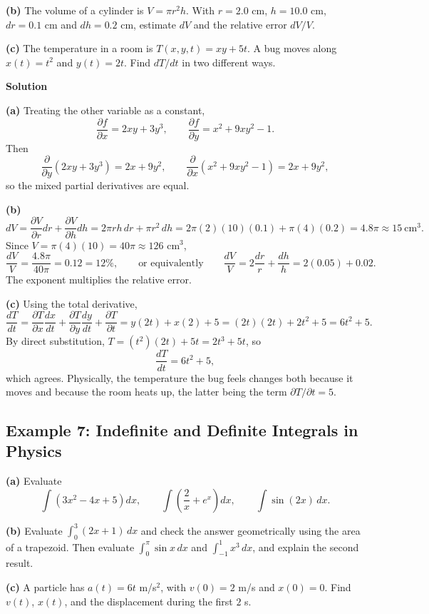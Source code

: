 \documentclass[12pt]{article}
\begin{document}
\textbf{(b)} The volume of a cylinder is $V = \pi r^2h$. With $r = 2.0$ cm, $h = 10.0$ cm, $dr = 0.1$ cm and $dh = 0.2$ cm, estimate $dV$ and the relative error $dV/V$.

\textbf{(c)} The temperature in a room is $T(x,y,t) = xy+5t$. A bug moves along $x(t) = t^2$ and $y(t) = 2t$. Find $dT/dt$ in two different ways.

\bigskip
\textbf{Solution}

\textbf{(a)} Treating the other variable as a constant,
\[
\frac{\partial f}{\partial x} = 2xy+3y^3,
\qquad
\frac{\partial f}{\partial y} = x^2+9xy^2-1 .
\]
Then
\[
\frac{\partial}{\partial y}\left(2xy+3y^3\right) = 2x+9y^2,
\qquad
\frac{\partial}{\partial x}\left(x^2+9xy^2-1\right) = 2x+9y^2,
\]
so the mixed partial derivatives are equal.

\textbf{(b)}
\[
dV = \frac{\partial V}{\partial r}dr + \frac{\partial V}{\partial h}dh
= 2\pi r h\,dr + \pi r^2\,dh
= 2\pi(2)(10)(0.1) + \pi(4)(0.2) = 4.8\pi \approx 15\ \text{cm}^3 .
\]
Since $V = \pi(4)(10) = 40\pi \approx 126$ cm$^3$,
\[
\frac{dV}{V} = \frac{4.8\pi}{40\pi} = 0.12 = 12\%,
\qquad \text{or equivalently} \qquad
\frac{dV}{V} = 2\frac{dr}{r} + \frac{dh}{h} = 2(0.05)+0.02 .
\]
The exponent multiplies the relative error.

\textbf{(c)} Using the total derivative,
\[
\frac{dT}{dt}
= \frac{\partial T}{\partial x}\frac{dx}{dt}
+ \frac{\partial T}{\partial y}\frac{dy}{dt}
+ \frac{\partial T}{\partial t}
= y(2t) + x(2) + 5
= (2t)(2t) + 2t^2 + 5 = 6t^2+5 .
\]
By direct substitution, $T = (t^2)(2t)+5t = 2t^3+5t$, so
\[
\frac{dT}{dt} = 6t^2+5 ,
\]
which agrees. Physically, the temperature the bug feels changes both because it moves and because the room heats up, the latter being the term $\partial T/\partial t = 5$.


\subsection{Example 7: Indefinite and Definite Integrals in Physics}

\textbf{(a)} Evaluate
\[
\int\left(3x^2-4x+5\right)dx,
\qquad
\int\left(\frac{2}{x}+e^x\right)dx,
\qquad
\int \sin(2x)\,dx .
\]

\textbf{(b)} Evaluate $\int_0^3(2x+1)\,dx$ and check the answer geometrically using the area of a trapezoid. Then evaluate $\int_0^\pi \sin x\,dx$ and $\int_{-1}^{1}x^3\,dx$, and explain the second result.

\textbf{(c)} A particle has $a(t) = 6t$ m/s$^2$, with $v(0) = 2$ m/s and $x(0) = 0$. Find $v(t)$, $x(t)$, and the displacement during the first $2$ s.
\end{document}
